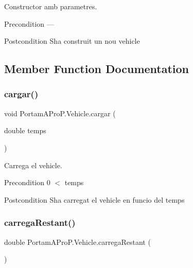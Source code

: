 Constructor amb parametres. 

\begin{DoxyPrecond}{Precondition}
--- 
\end{DoxyPrecond}
\begin{DoxyPostcond}{Postcondition}
S\textquotesingle{}ha construit un nou vehicle 
\end{DoxyPostcond}


\subsection{Member Function Documentation}
\mbox{\label{class_portam_a_pro_p_1_1_vehicle_ae39b60cb4d70ef1aef7ec97341eb25ce}} 
\subsubsection{\texorpdfstring{cargar()}{cargar()}}
{\footnotesize\ttfamily void Portam\+A\+Pro\+P.\+Vehicle.\+cargar (\begin{DoxyParamCaption}\item[{double}]{temps }\end{DoxyParamCaption})}



Carrega el vehicle. 

\begin{DoxyPrecond}{Precondition}
0 $<$ temps 
\end{DoxyPrecond}
\begin{DoxyPostcond}{Postcondition}
S\textquotesingle{}ha carregat el vehicle en funcio del temps 
\end{DoxyPostcond}
\mbox{\label{class_portam_a_pro_p_1_1_vehicle_a54547c7e60fb5f50cad5462ae4609562}} 
\subsubsection{\texorpdfstring{carrega\+Restant()}{carregaRestant()}}
{\footnotesize\ttfamily double Portam\+A\+Pro\+P.\+Vehicle.\+carrega\+Restant (\begin{DoxyParamCaption}{ }\end{DoxyParamCaption})}



